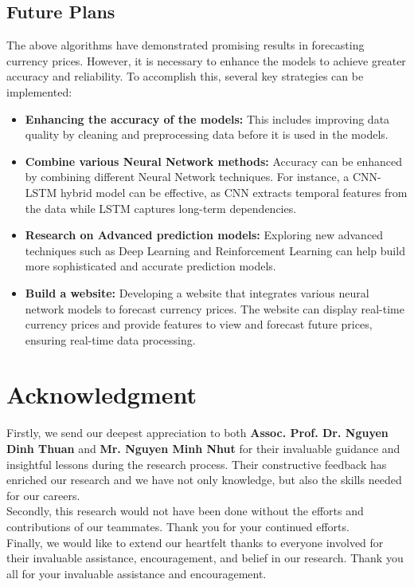 \documentclass{ieeeojies}
\begin{document}
\subsection{Future Plans}
The above algorithms have demonstrated promising results in forecasting currency prices. However, it is necessary to enhance the models to achieve greater accuracy and reliability. To accomplish this, several key strategies can be implemented:
\begin{itemize}
    \item \textbf{Enhancing the accuracy of the models:} This includes improving data quality by cleaning and preprocessing data before it is used in the models.
    \item \textbf{Combine various Neural Network methods:} Accuracy can be enhanced by combining different Neural Network techniques. For instance, a CNN-LSTM hybrid model can be effective, as CNN extracts temporal features from the data while LSTM captures long-term dependencies.
    \item \textbf{Research on Advanced prediction models:} Exploring new advanced techniques such as Deep Learning and Reinforcement Learning can help build more sophisticated and accurate prediction models.
    \item \textbf{Build a website:} Developing a website that integrates various neural network models to forecast currency prices. The website can display real-time currency prices and provide features to view and forecast future prices, ensuring real-time data processing.
\end{itemize}

\section*{Acknowledgment}
Firstly, we send our deepest appreciation to both \textbf{Assoc. Prof. Dr. Nguyen Dinh Thuan} and \textbf{Mr. Nguyen Minh Nhut} for their invaluable guidance and insightful lessons during the research process. Their constructive feedback has enriched our research and we have not only knowledge, but also the skills needed for our careers. 
\\Secondly, this research would not have been done without the efforts and contributions of our teammates. Thank you for your continued efforts. 
\\Finally, we would like to extend our heartfelt thanks to everyone involved for their invaluable assistance, encouragement, and belief in our research. Thank you all for your invaluable assistance and encouragement.

\EOD
\printbibliography
\end{document}

